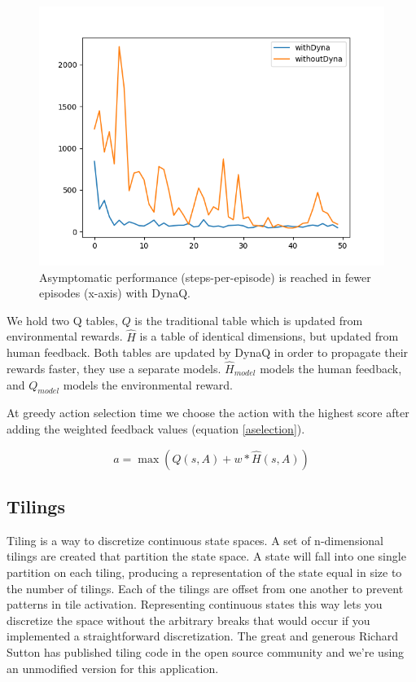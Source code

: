 \documentclass{article}
\begin{document}
\begin{figure}[t]
  \centering
    \includegraphics[width=\linewidth]{episodicComparison-5experiments-50episodes.png}
\caption{Asymptomatic performance (steps-per-episode) is reached in fewer episodes (x-axis) with DynaQ.}
\label{fig:dyna}
\end{figure}

We hold two Q tables, $Q$ is the traditional table which is updated from environmental rewards. $\hat{H}$ is a table of identical dimensions, but updated from human feedback. Both tables are updated by DynaQ in order to propagate their rewards faster, they use a separate models. $\hat{H}_{model}$ models the human feedback, and $Q_{model}$ models the environmental reward. 

At greedy action selection time we choose the action with the highest score after adding the weighted feedback values (equation \ref{aselection}).

\begin{equation}\label{aselection}
  a = \max(Q(s,A) + w * \hat{H}(s,A))
\end{equation}

\subsection{Tilings}

Tiling is a way to discretize continuous state spaces. A set of n-dimensional tilings are created that partition the state space. A state will fall into one single partition on each tiling, producing a representation of the state equal in size to the number of tilings. Each of the tilings are offset from one another to prevent patterns in tile activation. Representing continuous states this way lets you discretize the space without the arbitrary breaks that would occur if you implemented a straightforward discretization. The great and generous Richard Sutton has published tiling code in the open source community \cite{sutton_tile_nodate} and we're using an unmodified version for this application. 
\end{document}
